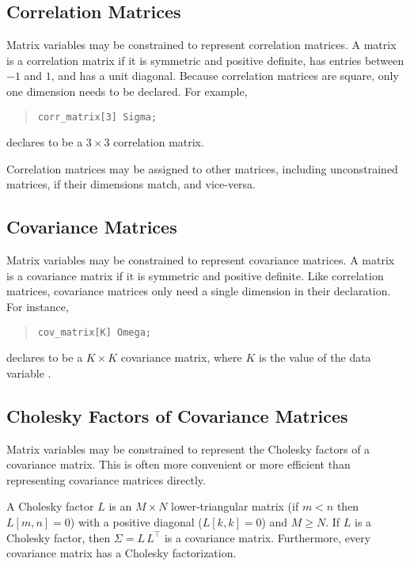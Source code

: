 \subsection{Correlation Matrices}

Matrix variables may be constrained to represent correlation matrices.
A matrix is a correlation matrix if it is symmetric and positive
definite, has entries between $-1$ and $1$, and has a unit diagonal.
Because correlation matrices are square, only one dimension needs
to be declared.  For example,
%
\begin{quote}
\begin{Verbatim} 
corr_matrix[3] Sigma;
\end{Verbatim}
\end{quote}
% 
declares  to be a $3 \times 3$ correlation matrix.

Correlation matrices may be assigned to other matrices, including
unconstrained matrices, if their dimensions match, and vice-versa.

\subsection{Covariance Matrices}

Matrix variables may be constrained to represent covariance matrices.
A matrix is a covariance matrix if it is symmetric and positive
definite.  Like correlation matrices, covariance matrices only need a
single dimension in their declaration.  For instance,
%
\begin{quote}
\begin{Verbatim} 
cov_matrix[K] Omega;
\end{Verbatim}
\end{quote}
% 
declares  to be a $K \times K$ covariance matrix, where
$K$ is the value of the data variable .  

\subsection{Cholesky Factors of Covariance Matrices}

Matrix variables may be constrained to represent the Cholesky factors
of a covariance matrix.  This is often more convenient or more
efficient than representing covariance matrices directly.  

A Cholesky factor $L$ is an $M \times N$ lower-triangular matrix (if
$m < n$ then $L[m,n] =0$) with a positive diagonal ($L[k,k] = 0$) and
$M \geq N$.  If $L$ is a Cholesky factor, then $\Sigma = L \, L^{\top}$
is a covariance matrix.  Furthermore, every covariance matrix has a
Cholesky factorization.

